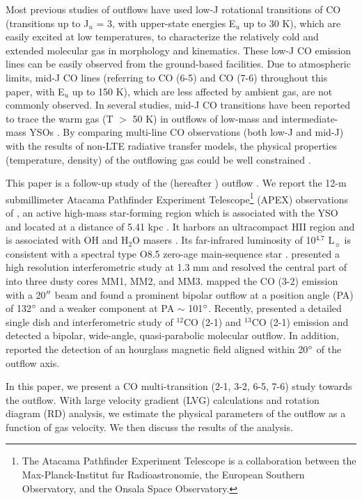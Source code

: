 Most previous studies of outflows have used low-J rotational transitions of CO (transitions up to J$_u$ = 3, with upper-state energies E$_u$ up to 30 K), which are easily excited at low temperatures, to characterize the relatively cold and extended molecular gas in morphology and kinematics. These low-J CO emission lines can be easily observed from the ground-based facilities. Due to atmospheric limits, mid-J CO lines (referring to CO (6-5) and CO (7-6) throughout this paper, with  E$_u$ up to 150 K), which are less affected by ambient gas, are not commonly observed. In several studies, mid-J CO transitions have been reported to trace the warm gas (T $>$ 50 K) in outflows of low-mass and intermediate-mass YSOs \citep{2009A&A...501..633V, 2009A&A...507.1425V, 2012A&A...542A..86Y, 2016A&A...587A..17V}.  By comparing multi-line CO observations (both low-J and mid-J) with the results of non-LTE radiative transfer models, the physical properties (temperature, density) of the outflowing gas could be well constrained \citep{2015A&A...581A...4L}. 

This paper is a follow-up study of the  (hereafter ) outflow \citep{2009ApJ...696...66Q}. We report the 12-m submillimeter Atacama Pathfinder Experiment Telescope\footnote{    The Atacama Pathfinder Experiment Telescope is a collaboration between the Max-Planck-Institut f$\ddot{\mathrm{u}}$r Radioastronomie, the European Southern Observatory, and the Onsala Space Observatory.} (APEX) observations of , an active high-mass star-forming region which is associated with the YSO  and located at a distance of 5.41 kpc \citep{2015PASJ...67...69S}. It harbors an ultracompact HII region and is associated with OH and H$_2$O masers \citep{1993AJ....105.1495H, 1997MNRAS.289..203C, 1998AJ....116.1897M, 1999ApJS..123..487M, 2003MNRAS.341..551C}. Its far-infrared luminosity of 10$^{4.7}$ L$_\sun$ is consistent with a spectral type O8.5 zero-age main-sequence star \citep{1998AJ....116.1897M}. \citet{2009ApJ...696...66Q} presented a high resolution interferometric study at 1.3 mm and resolved the central part of  into three dusty cores MM1, MM2, and MM3. \citet{2003A&A...412..175K} mapped the CO (3-2) emission with a 20${\mbox{$^{\prime\prime}$}}$ beam and found a prominent bipolar outflow at a position angle (PA) of 132${\mbox{$^\circ$}}$ and a weaker component at PA $\sim$ 101${\mbox{$^\circ$}}$. Recently, \citet{2009ApJ...696...66Q} presented a detailed single dish and interferometric study of $^{12}$CO (2-1) and $^{13}$CO (2-1) emission and detected a bipolar, wide-angle, quasi-parabolic molecular outflow. In addition, \citet{2014ApJ...794L..18Q} reported the detection of an hourglass magnetic field aligned within 20${\mbox{$^\circ$}}$ of the outflow axis.

In this paper, we present a CO multi-transition (2-1, 3-2, 6-5, 7-6) study towards the  outflow. With large velocity gradient (LVG) calculations and rotation diagram (RD) analysis, we estimate the physical parameters of the outflow as a function of gas velocity. We then discuss the results of the analysis.


